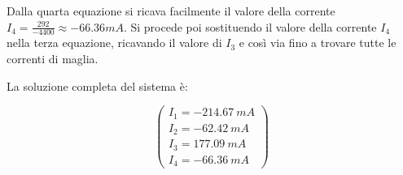 Dalla quarta equazione si ricava facilmente il valore della corrente $I_4 = \frac{292}{-4400} \approx -66.36mA.$ Si procede poi sostituendo il valore della corrente $I_4$ nella terza equazione, ricavando il valore di $I_3$ e così via fino a trovare tutte le correnti di maglia.

La soluzione completa del sistema è:

\begin{equation}
\left(\begin{matrix}
I_1 = \SI{-214,67}{mA} \\
I_2 = \SI{-62,42}{mA} \\
I_3 = \SI{177,09}{mA}\\
I_4 = \SI{-66,36}{mA}
\end{matrix}\right)
\end{equation}